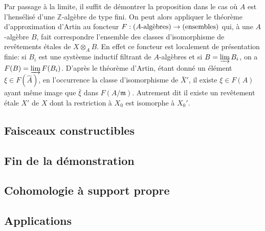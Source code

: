 \documentclass{article}
\newcommand{\dZ}{\mathbb{Z}}
\newcommand{\fm}{\mathfrak{m}}
\begin{document}
Par passage \`a la limite, il suffit de d\'emontrer la proposition dans le cas 
o\`u $A$ est l'hens\'elis\'e d'une $\dZ$-alg\`ebre de type fini. On peut alors 
appliquer le théorème d'approximation d'Artin au foncteur 
$F:(\textnormal{$A$-alg\`ebres}) \to (\textnormal{ensembles})$ qui, \`a une 
$A$-alg\`ebre $B$, fait correspondre l'ensemble des classes d'isomorphisme de 
revêtements \'etales de $X\otimes_A B$. En effet ce foncteur est localement de 
pr\'esentation finie: si $B_i$ est une syst\`eeme inductif filtrant de 
$A$-alg\`ebres et si $B=\varinjlim B_i$, on a $F(B) = \varinjlim F(B_i)$. 
D'apr\`es le théorème d'Artin, \'etant donn\'e un \'el\'ement 
$\xi\in F(\hat A)$, en l'occurrence la classe d'isomorphisme de $\bar X'$, il 
existe $\xi\in F(A)$ ayant même image que $\bar\xi$ dans $F(A/\fm)$. 
Autrement dit il existe un revêtement \'etale $X'$ de $X$ dont la restriction 
\`a $X_0$ est isomorphe \`a $X_0'$. 







\subsection{Faisceaux constructibles}\label{4-3}

\subsection{Fin de la démonstration}\label{4-4}

\subsection{Cohomologie \`a support propre}\label{4-5}

\subsection{Applications}\label{4-6}
\end{document}
